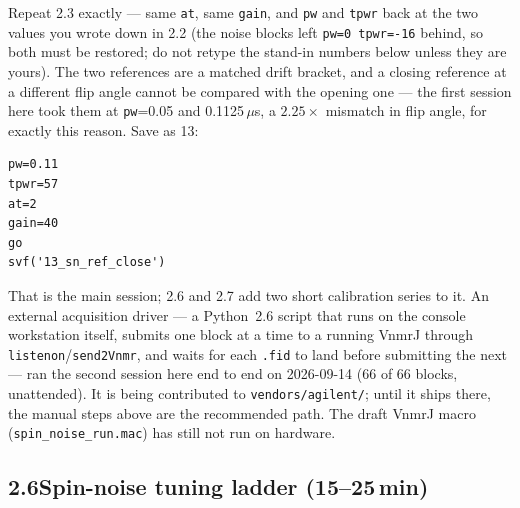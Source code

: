 \documentclass[11pt]{article}
\newcommand{\file}[1]{\texttt{#1}}
\begin{document}
Repeat 2.3 exactly --- same \texttt{at}, same \texttt{gain}, and
\texttt{pw} and \texttt{tpwr} back at the two values you wrote down in
2.2 (the noise blocks left \texttt{pw=0 tpwr=-16} behind, so both
must be restored; do not retype the stand-in numbers below unless they
are yours). The two references are a matched drift bracket, and a
closing reference at a different flip angle cannot be compared with
the opening one --- the first session here took them at
\texttt{pw}=0.05 and 0.1125\,$\mu$s, a $2.25\times$ mismatch in flip
angle, for exactly this reason. Save as 13:

\begin{lstlisting}
pw=0.11
tpwr=57
at=2
gain=40
go
svf('13_sn_ref_close')
\end{lstlisting}

That is the main session; 2.6 and 2.7 add two short calibration series
to it. An external acquisition driver --- a
Python~2.6 script that runs on the console workstation itself,
submits one block at a time to a running VnmrJ through
\texttt{listenon}/\texttt{send2Vnmr}, and waits for each \file{.fid}
to land before submitting the next --- ran the second session here end
to end on 2026-09-14 (66 of 66 blocks, unattended). It is being
contributed to \file{vendors/agilent/}; until it ships there, the
manual steps above are the recommended path. The draft VnmrJ macro
(\file{spin\_noise\_run.mac}) has still not run on hardware.

\subsection*{2.6\quad Spin-noise tuning ladder (15--25\,min)}
\end{document}
